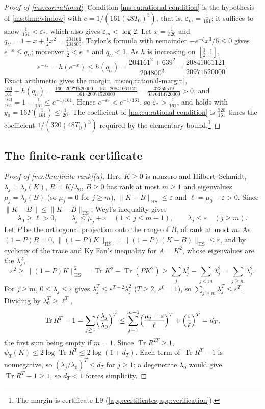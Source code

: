 \documentclass[11pt,a4paper]{amsart}
\theoremstyle{definition}
\theoremstyle{remark}
\numberwithin{equation}{section}
\DeclareMathOperator{\Tr}{Tr}        %
\newcommand{\norm}[1]{\lVert #1\rVert}     %
\newcommand{\Bstar}{\text{\upshape(B$^{*}$)}}       %
\begin{document}
\begin{proof}[Proof of \cref{ms:cor:rational}]
Condition \eqref{ms:eq:rational-condition} is the hypothesis of \cref{ms:thm:window} with $c=1/(161(48T_0)^3)$, that is, $\varepsilon_m=\frac1{161}$; it suffices to show $\frac1{161}<\varepsilon_*$, which also gives $\varepsilon_m<\log2$. Let $x=\frac1{320}$ and $q_U=1-x+\frac12x^2=\frac{204161}{204800}$. Taylor's formula with remainder $-e^{-\xi}x^3/6\le0$ gives $e^{-x}\le q_U$; moreover $\frac12<e^{-x}$ and $q_U<1$. As $h$ is increasing on $[\frac12,1]$,
\[
e^{-\varepsilon_*}=h(e^{-x})\le h(q_U)=\frac{204161^2+639^2}{204800^2}=\frac{20841061121}{20971520000}.
\]
Exact arithmetic gives the margin \eqref{ms:eq:rational-margin}, $\frac{160}{161}-h(q_U)=\frac{160\cdot20971520000-161\cdot20841061121}{161\cdot20971520000}=\frac{32359519}{3376414720000}>0$, and $\frac{160}{161}=1-\frac1{161}\le e^{-1/161}$. Hence $e^{-\varepsilon_*}<e^{-1/161}$, so $\varepsilon_*>\frac1{161}$, and \Bstar{} holds with $y_0=16F(\frac1{161})\le\frac1{20}$. The coefficient of \eqref{ms:eq:rational-condition} is $\frac{320}{161}$ times the coefficient $1/(320(48T_0)^3)$ required by the elementary bound.\footnote{The margin is certificate L9 (\cref{app:certificates,app:verification}).}
\end{proof}

\subsection{The finite-rank certificate}
\begin{proof}[Proof of \cref{ms:thm:finite-rank}(a)]
Here $K\ge0$ is nonzero and Hilbert--Schmidt, $\lambda_j=\lambda_j(K)$, $R=K/\lambda_0$, $B\ge0$ has rank at most $m\ge1$ and eigenvalues $\mu_j=\lambda_j(B)$ (so $\mu_j=0$ for $j\ge m$), $\norm{K-B}_{\mathrm{HS}}\le\varepsilon$ and $\ell=\mu_0-\varepsilon>0$. Since $\norm{K-B}\le\norm{K-B}_{\mathrm{HS}}$, Weyl's inequality gives
\[
\lambda_0\ge\ell>0,\qquad \lambda_j\le\mu_j+\varepsilon\quad(1\le j\le m-1),\qquad \lambda_j\le\varepsilon\quad(j\ge m).
\]
Let $P$ be the orthogonal projection onto the range of $B$, of rank at most $m$. As $(1-P)B=0$, $\norm{(1-P)K}_{\mathrm{HS}}=\norm{(1-P)(K-B)}_{\mathrm{HS}}\le\varepsilon$, and by cyclicity of the trace and Ky Fan's inequality for $A=K^2$, whose eigenvalues are the $\lambda_j^2$,
\[
\varepsilon^2\ge\norm{(1-P)K}_{\mathrm{HS}}^2=\Tr K^2-\Tr(PK^2)\ge\sum_j\lambda_j^2-\sum_{j<m}\lambda_j^2=\sum_{j\ge m}\lambda_j^2 .
\]
For $j\ge m$, $0\le\lambda_j\le\varepsilon$ gives $\lambda_j^T\le\varepsilon^{T-2}\lambda_j^2$ ($T\ge2$, $\varepsilon^0=1$), so $\sum_{j\ge m}\lambda_j^T\le\varepsilon^T$. Dividing by $\lambda_0^T\ge\ell^T$,
\[
\Tr R^T-1=\sum_{j\ge1}\Bigl(\frac{\lambda_j}{\lambda_0}\Bigr)^T\le\sum_{j=1}^{m-1}\Bigl(\frac{\mu_j+\varepsilon}{\ell}\Bigr)^T+\Bigl(\frac{\varepsilon}{\ell}\Bigr)^T=d_T ,
\]
the first sum being empty if $m=1$. Since $\Tr R^{2T}\ge1$, $\psi_T(K)\le2\log\Tr R^T\le2\log(1+d_T)$. Each term of $\Tr R^T-1$ is nonnegative, so $(\lambda_j/\lambda_0)^T\le d_T$ for $j\ge1$; a degenerate $\lambda_0$ would give $\Tr R^T-1\ge1$, so $d_T<1$ forces simplicity.
\end{proof}
\end{document}
